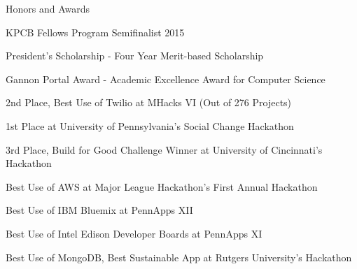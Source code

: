 \documentclass{resume} %
\begin{document}

\begin{rHonorsSection}{Honors and Awards}
\item KPCB Fellows Program Semifinalist 2015
\item President's Scholarship - Four Year Merit-based Scholarship
\item Gannon Portal Award - Academic Excellence Award for Computer Science
\setlength\itemsep{0em}
\item 2nd Place, Best Use of Twilio at MHacks VI (Out of 276 Projects)
\setlength\itemsep{-0.4em}
\item 1st Place at University of Pennsylvania's Social Change Hackathon
\item 3rd Place, Build for Good Challenge Winner at University of Cincinnati's Hackathon
\item Best Use of AWS at Major League Hackathon's First Annual Hackathon
\item Best Use of IBM Bluemix at PennApps XII
\item Best Use of Intel Edison Developer Boards at PennApps XI
\item Best Use of MongoDB, Best Sustainable App at Rutgers University's Hackathon

\end{rHonorsSection}

\end{document}
